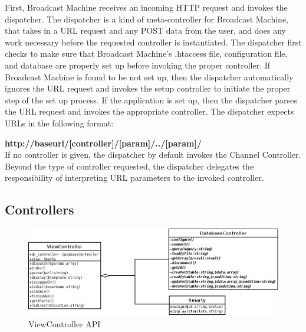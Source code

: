 \documentclass[a4paper,12pt]{report}
\begin{document}
First, Broadcast Machine receives an incoming HTTP request and invokes the dispatcher. The dispatcher is a kind of meta-controller for Broadcast Machine, that takes in a URL request and any POST data from the user, and does any work necessary before the requested controller is instantiated. The dispatcher first checks to make sure that Broadcast Machine's .htaccess file, configuration file, and database are properly set up before invoking the proper controller. If Broadcast Machine is found to be not set up, then the dispatcher automatically ignores the URL request and invokes the setup controller to initiate the proper step of the set up process. If the application is set up, then the dispatcher parses the URL request and invokes the appropriate controller. The dispatcher expects URLs in the following format:

\textbf{http://baseurl/[controller]/[param]/../[param]/} \\

If no controller is given, the dispatcher by default invokes the Channel Controller. Beyond the type of controller requested, the dispatcher delegates the responsibility of interpreting URL parameters to the invoked controller.

\subsection{Controllers}

\begin{figure}[h]
\begin{center}
\includegraphics[scale=0.5]{./images/controllers.png}
\end{center}
\caption{ViewController API}
\end{figure}
\end{document}
